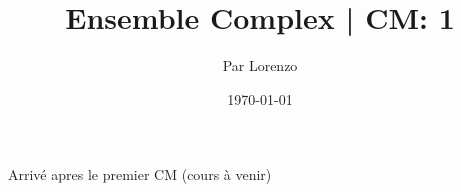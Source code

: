 \documentclass[a4paper, 12pt]{article}
\title{Ensemble Complex | CM: 1}
\author{Par Lorenzo}
\date{\today}
\begin{document}
\maketitle

Arrivé apres le premier CM (cours à venir)
\end{document}
